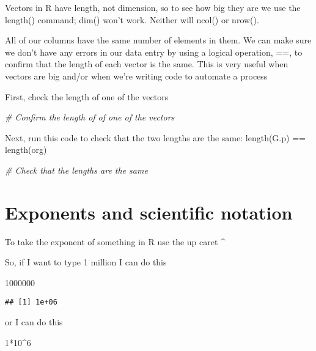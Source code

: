 \documentclass[
]{book}
\newenvironment{Shaded}{\begin{snugshade}}{\end{snugshade}}
\newcommand{\CommentTok}[1]{\textcolor[rgb]{0.56,0.35,0.01}{\textit{#1}}}
\newcommand{\DecValTok}[1]{\textcolor[rgb]{0.00,0.00,0.81}{#1}}
\newcommand{\SpecialCharTok}[1]{\textcolor[rgb]{0.00,0.00,0.00}{#1}}
\begin{document}
Vectors in R have length, not dimension, so to see how big they are we use the length() command; dim() won't work. Neither will ncol() or nrow().

All of our columns have the same number of elements in them. We can make sure we don't have any errors in our data entry by using a logical operation, ==, to confirm that the length of each vector is the same. This is very useful when vectors are big and/or when we're writing code to automate a process

First, check the length of one of the vectors

\begin{Shaded}
\begin{Highlighting}[]
\CommentTok{\# Confirm the length of of one of the vectors}
\end{Highlighting}
\end{Shaded}

Next, run this code to check that the two lengths are the same: length(G.p) == length(org)

\begin{Shaded}
\begin{Highlighting}[]
\CommentTok{\# Check that the lengths are the same}
\end{Highlighting}
\end{Shaded}

\hypertarget{exponents-and-scientific-notation}{%
\section{Exponents and scientific notation}\label{exponents-and-scientific-notation}}

To take the exponent of something in R use the up caret \^{}

So, if I want to type 1 million I can do this

\begin{Shaded}
\begin{Highlighting}[]
\DecValTok{1000000}
\end{Highlighting}
\end{Shaded}

\begin{verbatim}
## [1] 1e+06
\end{verbatim}

or I can do this

\begin{Shaded}
\begin{Highlighting}[]
\DecValTok{1}\SpecialCharTok{*}\DecValTok{10}\SpecialCharTok{\^{}}\DecValTok{6}
\end{Highlighting}
\end{Shaded}
\end{document}

